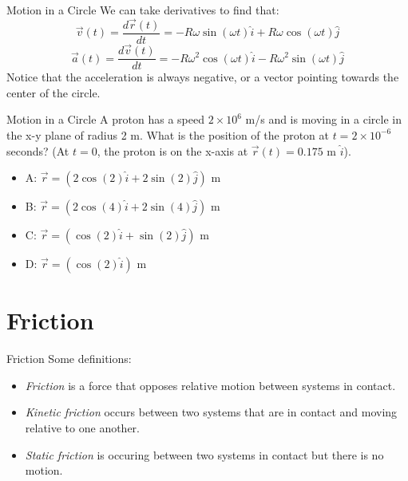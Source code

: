 \documentclass{beamer}
\begin{document}
\begin{frame}{Motion in a Circle}
We can take derivatives to find that:
\begin{equation}
\vec{v}(t) = \frac{d\vec{r}(t)}{dt} = -R\omega\sin(\omega t) \hat{i} + R\omega\cos(\omega t) \hat{j}
\end{equation}
\begin{equation}
\vec{a}(t) = \frac{d\vec{v}(t)}{dt} = -R\omega^2\cos(\omega t) \hat{i} - R\omega^2\sin(\omega t) \hat{j}
\end{equation}
Notice that the acceleration is always negative, or a vector pointing towards the center of the circle.
\end{frame}

\begin{frame}{Motion in a Circle}
A proton has a speed $2 \times 10^6$ m/s and is moving in a circle in the x-y plane of radius 2 m.  What is the position of the proton at $t = 2 \times 10^{-6}$ seconds?  (At $t=0$, the proton is on the x-axis at $\vec{r}(t) = 0.175$ m $\hat{i}$).
\begin{itemize}
\item A: $\vec{r} = (2\cos(2)\hat{i} + 2\sin(2)\hat{j})$ m
\item B: $\vec{r} = (2\cos(4)\hat{i} + 2\sin(4)\hat{j})$ m
\item C: $\vec{r} = (\cos(2)\hat{i} + \sin(2)\hat{j})$ m
\item D: $\vec{r} = (\cos(2)\hat{i})$ m
\end{itemize}
\end{frame}

\section{Friction}

\begin{frame}{Friction}
Some definitions: \\
\begin{itemize}
\item \textit{\alert{Friction}} is a force that opposes relative motion between systems in contact.
\item \textit{\alert{Kinetic friction}} occurs between two systems that are in contact and moving relative to one another.
\item \textit{\alert{Static friction}} is occuring between two systems in contact but there is no motion.
\end{itemize}
\end{frame}
\end{document}
